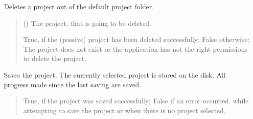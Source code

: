 \documentclass[letterpaper,10pt,english]{sphinxmanual}
\begin{document}
\begin{fulllineitems}
\begin{fulllineitems}
\begin{quote}
\begin{description}
\end{description}\end{quote}

\end{fulllineitems}


\begin{fulllineitems}
\label{\detokenize{apidoc/src.osm_configurator.control:src.osm_configurator.control.control.Control.delete_passive_project}}
\pysigstartsignatures
{}
\pysigstopsignatures
\sphinxAtStartPar
Deletes a project out of the default project folder.
\begin{quote}\begin{description}
\sphinxAtStartPar
{} ({\hyperref[\detokenize{apidoc/src.osm_configurator.model.application:src.osm_configurator.model.application.passive_project.PassiveProject}]{}}) \textendash{} The project, that is going to be deleted.

\sphinxAtStartPar
True, if the (passive) project has been deleted successfully; False otherwise: The project does not exist or the application has not the right permissions to delete the project.

\sphinxAtStartPar
{}

\end{description}\end{quote}

\end{fulllineitems}


\begin{fulllineitems}
\label{\detokenize{apidoc/src.osm_configurator.control:src.osm_configurator.control.control.Control.save_project}}
\pysigstartsignatures
{}
\pysigstopsignatures
\sphinxAtStartPar
Saves the project.
The currently selected project is stored on the disk. All progress made since the last saving are saved.
\begin{quote}\begin{description}
\sphinxAtStartPar
True, if the project was saved successfully; False if an error occurred, while attempting to save the project or when there is no project selected.


\end{description}
\end{quote}
\end{fulllineitems}
\end{fulllineitems}
\end{document}
